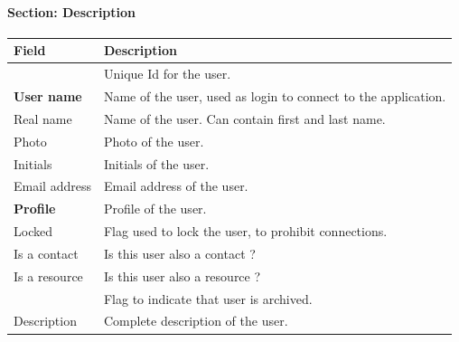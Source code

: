 \documentclass[letterpaper,10pt,english]{sphinxmanual}
\begin{document}
\paragraph{Section: Description}

\begin{tabulary}{\linewidth}{|l|l|}
\hline
\textsf{\relax 
Field
} & \textsf{\relax 
Description
}\\
\hline
{\hyperref[Glossary:term-id]{\emph{}}}
 & 
Unique Id for the user.
\\
\hline
\textbf{User name}
 & 
Name of the user, used as login to connect to the application.
\\
\hline
Real name
 & 
Name of the user. Can contain first and last name.
\\
\hline
Photo
 & 
Photo of the user.
\\
\hline
Initials
 & 
Initials of the user.
\\
\hline
Email address
 & 
Email address of the user.
\\
\hline
\textbf{Profile}
 & 
Profile of the user.
\\
\hline
Locked
 & 
Flag used to lock the user, to prohibit connections.
\\
\hline
Is a contact
 & 
Is this user also a contact ?
\\
\hline
Is a resource
 & 
Is this user also a resource ?
\\
\hline
{\hyperref[Glossary:term-closed]{\emph{}}}
 & 
Flag to indicate that user is archived.
\\
\hline
Description
 & 
Complete description of the user.
\\
\hline\end{tabulary}
\end{document}
